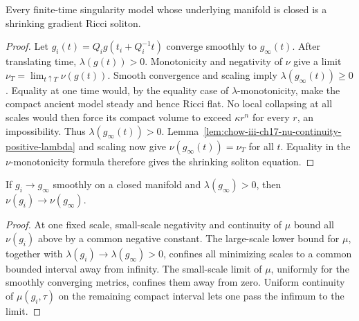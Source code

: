 \begin{theorem}
\label{thm:chow-iii-ch17-compact-model-shrinker}
Every finite-time singularity model whose underlying manifold is closed is a
shrinking gradient Ricci soliton.
\end{theorem}
\begin{proof}
Let $g_i(t)=Q_i g(t_i+Q_i^{-1}t)$ converge smoothly to $g_\infty(t)$.
After translating time, $\lambda(g(t))>0$.  Monotonicity and negativity of
$\nu$ give a limit $\nu_T=\lim_{t\uparrow T}\nu(g(t))$.
Smooth convergence and scaling imply $\lambda(g_\infty(t))\ge0$.  Equality
at one time would, by the equality case of $\lambda$-monotonicity, make the
compact ancient model steady and hence Ricci flat.  No local collapsing at
all scales would then force its compact volume to exceed $\kappa r^n$ for
every $r$, an impossibility.  Thus $\lambda(g_\infty(t))>0$.
Lemma~\ref{lem:chow-iii-ch17-nu-continuity-positive-lambda} and scaling now
give $\nu(g_\infty(t))=\nu_T$ for all $t$.  Equality in the
$\nu$-monotonicity formula therefore gives the shrinking soliton equation.
\end{proof}

\begin{lemma}
\label{lem:chow-iii-ch17-nu-continuity-positive-lambda}
If $g_i\to g_\infty$ smoothly on a closed manifold and
$\lambda(g_\infty)>0$, then $\nu(g_i)\to\nu(g_\infty)$.
\end{lemma}
\begin{proof}
At one fixed scale, small-scale negativity and continuity of $\mu$ bound all
$\nu(g_i)$ above by a common negative constant.  The large-scale lower bound
for $\mu$, together with $\lambda(g_i)\to\lambda(g_\infty)>0$, confines all
minimizing scales to a common bounded interval away from infinity.  The
small-scale limit of $\mu$, uniformly for the smoothly converging metrics,
confines them away from zero.  Uniform continuity of $\mu(g_i,\tau)$ on the
remaining compact interval lets one pass the infimum to the limit.
\end{proof}

